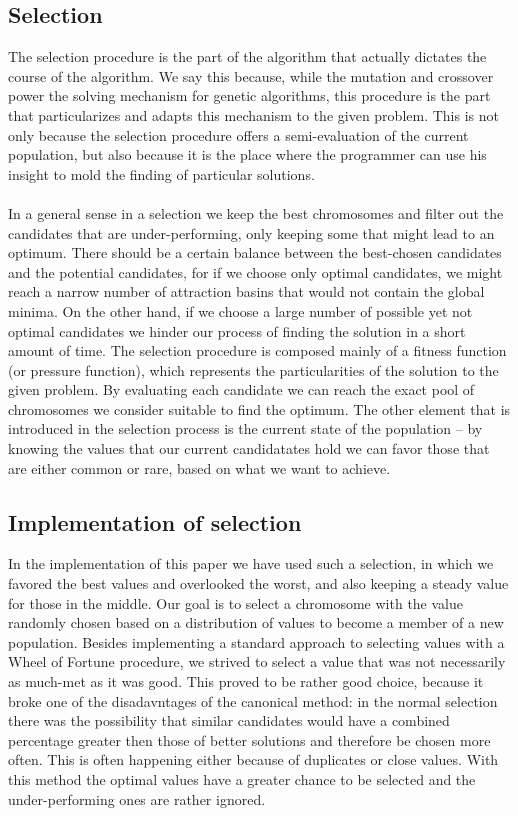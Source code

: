 \documentclass{article}
\begin{document}
\subsection{Selection}
The selection procedure is the part of the algorithm that actually dictates the course of the algorithm. We say this because, while the mutation and crossover power the solving mechanism for genetic algorithms, this procedure is the part that particularizes and adapts this mechanism to the given problem. This is not only because the selection procedure offers a semi-evaluation of the current population, but also because it is the place where the programmer can use his insight to mold the finding of particular solutions. \\\\
In a general sense in a selection we keep the best chromosomes and filter out the candidates that are under-performing, only keeping some that might lead to an optimum. There should be a certain balance between the best-chosen candidates and the potential candidates, for if we choose only optimal candidates, we might reach a narrow number of attraction basins that would not contain the global minima. On the other hand, if we choose a large number of possible yet not optimal candidates we hinder our process of finding the solution in a short amount of time.
The selection procedure is composed mainly of a fitness function (or pressure function), which represents the particularities of the solution to the given problem. By evaluating each candidate we can reach the exact pool of chromosomes we consider suitable to find the optimum. The other element that is introduced in the selection process is the current state of the population – by knowing the values that our current candidatates hold we can favor those that are either common or rare, based on what we want to achieve.

\subsection{Implementation of selection}
In the implementation of this paper we have used such a selection, in which we favored the best values and overlooked the worst, and also keeping a steady value for those in the middle. Our goal is to select a chromosome with the value randomly chosen based on a distribution of values to become a member of a new population. Besides implementing a standard approach to selecting values with a Wheel of Fortune procedure, we strived to select a value that was not necessarily as much-met as it was good. This proved to be rather good choice, because it broke one of the disadavntages of the canonical method: in the normal selection there was the possibility that similar candidates would have a combined percentage greater then those of better solutions and therefore be chosen more often. This is often happening either because of duplicates or close values. With this method the optimal values have a greater chance to be selected and the under-performing ones are rather ignored.
\end{document}
